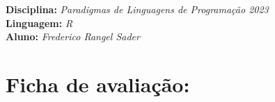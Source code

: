 



\noindent
\textbf{Disciplina:} \textit{Paradigmas de Linguagens de Programa\c{c}\~{a}o 2023}\\
\textbf{Linguagem:} \textit{R}\\
\textbf{Aluno:} \textit{ \color{blue} Frederico Rangel Sader}


\section*{Ficha de avalia\c{c}\~{a}o:}



